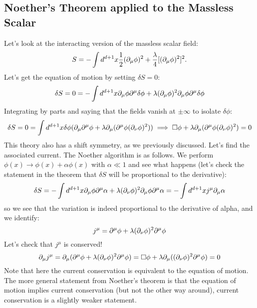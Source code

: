 \subsection{Noether's Theorem applied to the Massless Scalar}
Let's look at the interacting version of the massless scalar field:
\begin{equation}
    S = -\int d^{d+1}x \frac{1}{2}(\partial_\mu \phi)^2 + \frac{\lambda}{4}[(\partial_\mu \phi)^2]^2.
\end{equation}
Let's get the equation of motion by setting $\delta S = 0$:
\begin{equation}
    \delta S = 0 = -\int d^{d+1}x \partial_\mu \phi \partial^\mu \delta \phi + \lambda (\partial_\mu \phi)^2 \partial_\mu \phi \partial^\mu \delta \phi
\end{equation}
Integrating by parts and saying that the fields vanish at $\pm \infty$ to isolate $\delta \phi$:
\begin{equation}
    \delta S = 0 = \int d^{d+1}x \delta\phi(\partial_\mu \partial^\mu \phi + \lambda \partial_\mu(\partial^\mu \phi(\partial_\nu \phi)^2)) \implies \square \phi + \lambda \partial_\mu (\partial^\mu \phi(\partial_\nu \phi)^2) = 0
\end{equation}
This theory also has a shift symmetry, as we previously discussed. Let's find the associated current. The Noether algorithm is as follows. We perform $\phi(x) \to \phi(x) + \alpha\phi(x)$ with $\alpha \ll 1$ and see what happens (let's check the statement in the theorem that $\delta S$ will be proportional to the derivative):
\begin{equation}
    \delta S = -\int d^{d+1}x \partial_\mu \phi \partial^\mu \alpha + \lambda(\partial_\nu \phi)^2 \partial_\mu \phi \partial^\mu \alpha = -\int d^{d+1}x j^\mu \partial_\mu \alpha
\end{equation}
so we see that the variation is indeed proportional to the derivative of alpha, and we identify:
\begin{equation}
    j^\mu = \partial^\mu \phi + \lambda(\partial_\nu \phi)^2 \partial^\mu \phi
\end{equation}
Let's check that $j^\mu$ is conserved!
\begin{equation}
    \partial_\mu j^\mu = \partial_\mu(\partial^\mu \phi + \lambda(\partial_\nu \phi)^2 \partial^\mu \phi) = \square \phi + \lambda \partial_\mu((\partial_\nu \phi)^2 \partial^\mu \phi) = 0
\end{equation}
Note that here the current conservation is equivalent to the equation of motion. The more general statement from Noether's theorem is that the equation of motion implies current conservation (but not the other way around), current conservation is a slightly weaker statement.

